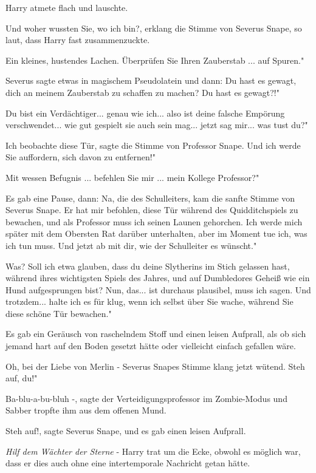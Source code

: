 Harry atmete flach und lauschte.

\glqq Und woher wussten Sie, wo ich bin?\grqq{}, erklang die Stimme von Severus
Snape, so laut, dass Harry fast zusammenzuckte.

Ein kleines, hustendes Lachen. \glqq Überprüfen Sie Ihren Zauberstab ... auf
Spuren."

Severus sagte etwas in magischem Pseudolatein und dann: \glqq Du hast es gewagt,
dich an meinem Zauberstab zu schaffen zu machen? Du hast es gewagt?!"

\glqq Du bist ein Verdächtiger... genau wie ich... also ist deine falsche
Empörung verschwendet... wie gut gespielt sie auch sein mag... jetzt sag mir...
was tust du?"

\glqq Ich beobachte diese Tür\grqq{}, sagte die Stimme von Professor Snape.
\glqq Und ich werde Sie auffordern, sich davon zu entfernen!"

\glqq Mit wessen Befugnis ... befehlen Sie mir ... mein Kollege Professor?"

Es gab eine Pause, dann: \glqq Na, die des Schulleiters\grqq{}, kam die sanfte
Stimme von Severus Snape. \glqq Er hat mir befohlen, diese Tür während des
Quidditchspiels zu bewachen, und als Professor muss ich seinen Launen gehorchen.
Ich werde mich später mit dem Obersten Rat darüber unterhalten, aber im Moment
tue ich, was ich tun muss. Und jetzt ab mit dir, wie der Schulleiter es
wünscht."

\glqq Was? Soll ich etwa glauben, dass du deine Slytherins im Stich gelassen
hast, während ihres wichtigsten Spiels des Jahres, und auf Dumbledores Geheiß
wie ein Hund aufgesprungen bist? Nun, das... ist durchaus plausibel, muss ich
sagen. Und trotzdem... halte ich es für klug, wenn ich selbst über Sie wache,
während Sie diese schöne Tür bewachen."

Es gab ein Geräusch von raschelndem Stoff und einen leisen Aufprall, als ob sich
jemand hart auf den Boden gesetzt hätte oder vielleicht einfach gefallen wäre.

\glqq Oh, bei der Liebe von Merlin -\grqq{} Severus Snapes Stimme klang jetzt
wütend. \glqq Steh auf, du!"

\glqq Ba-blu-a-bu-bluh -\grqq{}, sagte der Verteidigungsprofessor im
Zombie-Modus und Sabber tropfte ihm aus dem offenen Mund.

\glqq Steh auf!\grqq{}, sagte Severus Snape, und es gab einen leisen Aufprall.

\emph{Hilf dem Wächter der Sterne }- Harry trat um die Ecke, obwohl es möglich
war, dass er dies auch ohne eine intertemporale Nachricht getan hätte.

